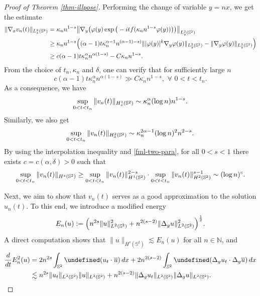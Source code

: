 \documentclass[11pt, reqno]{amsart}
\numberwithin{equation}{section}
\let\Re=\undefined\DeclareMathOperator*{\Re}{Re}
\theoremstyle{definition}
\theoremstyle{remark}
\begin{document}
\begin{proof}[Proof of Theorem \ref{thm-illpose}]
Performing the change of variable $y = nx$, we get the estimate  
\begin{align}\nonumber
\|\nabla_x v_n(t)\|_{L^2_x(\Bbb S^2)} &= \kappa_n n^{1-s} \big\|\nabla_y\big( \varphi(y)\exp\big( -itf(\kappa_n n^{1-s} \varphi(y)) \big) \big) \big\|_{L^2_y(\Bbb S^2)}\\\nonumber
&\ge \kappa_n n^{1-s} \Big( (\alpha-1) t \kappa_n^{\alpha-1} n^{(\alpha-1)-s)} \||\varphi(y)|^k\nabla_y \varphi(y)\|_{L^2_y(\Bbb S^2)} - \|\nabla_y \varphi(y)\|_{L^2_y(\Bbb S^2)} \Big)\\\label{fml-nabla-vn}
&\ge c(\alpha-1)t \kappa_n^{\alpha} n^{\alpha(1-s)} - C \kappa_n n^{1-s}.
\end{align}
{From the choice of $t_n,\kappa_n$ and $\delta$, one can verify that for sufficiently large $n$} 
\begin{equation*}
{c(\alpha-1)t \kappa_n^{\alpha} n^{\alpha(1-s)} \gg C \kappa_n n^{1-s},\,\, \forall \,\, 0<t<t_n.}
\end{equation*}
As a consequence, we have
\begin{equation*}
{\sup_{0<t<t_n}\|v_n(t)\|_{H^1_x(\Bbb S^2)} \sim \kappa_n^\alpha (\log n) n^{1-s}.}
\end{equation*}
Similarly, we also get
\begin{equation*}
{\sup_{0<t<t_n}\|v_n(t)\|_{H^2_x(\Bbb S^2)} \sim \kappa_n^{2\alpha-1} (\log n)^2 n^{2-s}.}
\end{equation*}
By using the interpolation inequality and \eqref{fml-two-para}, for all $0<s<1$ there exists $c=c(\alpha,\delta)>0$ such that
\begin{equation}\label{fml-vn-Hs}
\sup_{0<t<t_n}\|v_n(t)\|_{H^s(\Bbb S^2)} \ge \sup_{0<t<t_n}\|v_n(t)\|^{2-s}_{H^1(\Bbb S^2)}\cdot  \sup_{0<t<t_n}\|v_n(t)\|^{s-1}_{H^2(\Bbb S^2)} \sim (\log n)^c.
\end{equation}
		
Next, we aim to  show that $v_n(t)$ serves as a good approximation to the  solution $u_n(t)$. To this end, we introduce a modified energy   
\begin{equation*}
E_n(u) := \Big( n^{2s}\|u\|^2_{L^2(\Bbb S^2)} + n^{2(s-2)}\|\Delta_g u\|^2_{L^2(\Bbb S^2)} \Big)^{\frac{1}{2}}.
\end{equation*}
A direct computation shows that $\|u\|_{H^s(\mathbb{S}^2)} \lesssim E_n(u)$ for all $n \in \mathbb{N}$, and  
\begin{equation}\label{fml-deri-En}
\begin{aligned}
\frac{d}{dt} E^2_n(u) &= 2n^{2s} \int_{\Bbb S^2} \Re(u_t \cdot\overline{u})\, dx + 2n^{2(s-2)} \int_{\Bbb S^2} \Re(\Delta_g u_t \cdot\Delta_g\overline{u})\, dx\\
&\lesssim n^{2s} \|u_t\|_{L^2(\Bbb S^2)}\|u\|_{L^2(\Bbb S^2)} + n^{2(s-2)} \|\Delta_g u_t\|_{L^2(\Bbb S^2)}\|\Delta_g u\|_{L^2(\Bbb S^2)}.
\end{aligned}
\end{equation}
		

\end{proof}
\end{document}
